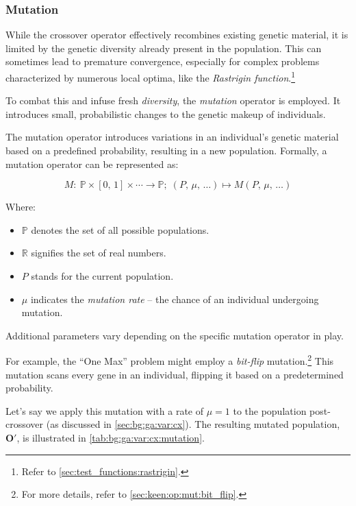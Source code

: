 \subsubsection{Mutation}
\label{sec:bg:ga:var:mut}
  While the crossover operator effectively recombines existing genetic 
  material, it is limited by the genetic diversity already present in the 
  population.
  This can sometimes lead to premature convergence, especially for complex 
  problems characterized by numerous local optima, like the \emph{Rastrigin function}.\footnote{Refer to \vref{sec:test_functions:rastrigin}.}

  To combat this and infuse fresh \textit{diversity}, the \textit{mutation} 
  operator is employed.
  It introduces small, probabilistic changes to the genetic makeup of 
  individuals.

  \begin{definition}
  \label{def:mutation_operator}
    The mutation operator introduces variations in an individual's genetic 
    material based on a predefined probability, resulting in a new population. 
    Formally, a mutation operator can be represented as:

    \[ 
      M :\: \mathbb{P} \times [0,\, 1] \times \cdots \to \mathbb{P};\; 
      (P,\, \mu,\, \dots) \mapsto M(P,\, \mu,\, \dots) 
    \]

    Where:

    \begin{itemize}
      \item \(\mathbb{P}\) denotes the set of all possible populations.
      \item \(\mathbb{R}\) signifies the set of real numbers.
      \item \(P\) stands for the current population.
      \item \(\mu\) indicates the \textit{mutation rate} -- the chance of an 
        individual undergoing mutation.
    \end{itemize}

    Additional parameters vary depending on the specific mutation operator in   
    play.
  \end{definition}

  For example, the \enquote{One Max} problem might employ a \emph{bit-flip} 
  mutation.\footnote{
    For more details, refer to \vref{sec:keen:op:mut:bit_flip}.
  }
  This mutation scans every gene in an individual, flipping it based on a 
  predetermined probability.

  Let's say we apply this mutation with a rate of \(\mu = 1\) to the population 
  post-crossover (as discussed in \vref{sec:bg:ga:var:cx}).
  The resulting mutated population, \(\mathbf{O}'\), is illustrated in 
  \vref{tab:bg:ga:var:cx:mutation}.

